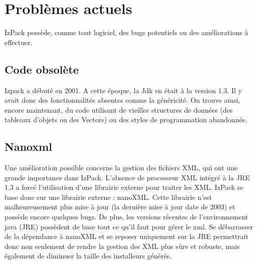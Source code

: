 \section{Problèmes actuels}
IzPack possède, comme tout logiciel, des bugs potentiels ou des améliorations à effectuer.
\subsection{Code obsolète}
Izpack a débuté en 2001.
A cette époque, la Jdk en était à la version 1.3. Il y avait donc des fonctionnalités absentes comme la généricité.
On trouve ainsi, encore maintenant, du code utilisant de vieilles structures de données (des tableaux d'objets ou des Vectors) ou des styles de programmation abandonnés.
\subsection{Nanoxml}
Une amélioration possible concerne la gestion des fichiers XML, qui ont une grande importance dans IzPack.
L'absence de processeur XML intégré à la JRE 1.3 a forcé l'utilisation d'une librairie externe pour traiter les XML.
IzPack se base donc sur une librairie externe : nanoXML.
Cette librairie n'est malheureusement plus mise à jour (la dernière mise à jour date de 2003) et possède encore quelques bugs.
De plus, les versions récentes de l'environnement java (JRE) possèdent de base tout ce qu'il faut pour gérer le xml.
Se débarrasser de la dépendance à nanoXML et se reposer uniquement sur la JRE permettrait donc non seulement de rendre la gestion des XML plus sûre et robuste, mais également de diminuer la taille des installeurs générés.
